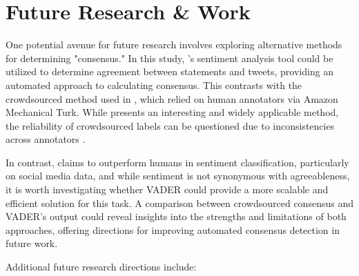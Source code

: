 \documentclass[14]{article}
\begin{document}
\section{Future Research \& Work}

One potential avenue for future research involves exploring alternative methods for determining "consensus." In this study, \citet{vader}'s sentiment analysis tool could be utilized to determine agreement between statements and tweets, providing an automated approach to calculating consensus. This contrasts with the crowdsourced method used in \citet{truthseeker}, which relied on human annotators via Amazon Mechanical Turk. While \citet{truthseeker} presents an interesting and widely applicable method, the reliability of crowdsourced labels can be questioned due to inconsistencies across annotators \cite{fact_check_fact_checker}. 

In contrast, \citet{vader} claims to outperform humans in sentiment classification, particularly on social media data, and while sentiment is not synonymous with agreeableness, it is worth investigating whether VADER could provide a more scalable and efficient solution for this task. A comparison between crowdsourced consensus and VADER's output could reveal insights into the strengths and limitations of both approaches, offering directions for improving automated consensus detection in future work.

Additional future research directions include:
\end{document}
